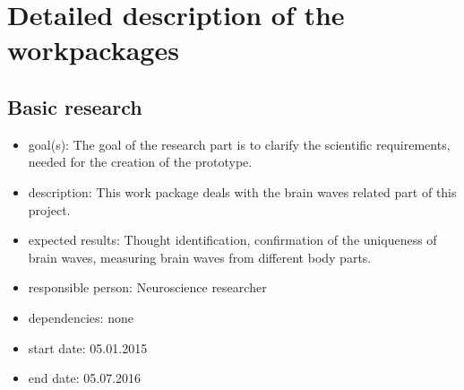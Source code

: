 \section{Detailed description of the workpackages}
\label{sect:workplan}


\subsection{Basic research}
\begin{itemize}
 \item goal(s): The goal of the research part is to clarify the scientific requirements, needed for the creation of the prototype.
 \item description: This work package deals with the brain waves related part of this project.
 \item expected results: Thought identification, confirmation of the uniqueness of brain waves, measuring brain waves from different body parts.
 \item responsible person: Neuroscience researcher
 \item dependencies: none
 \item start date: 05.01.2015
 \item end date: 05.07.2016
\end{itemize}

